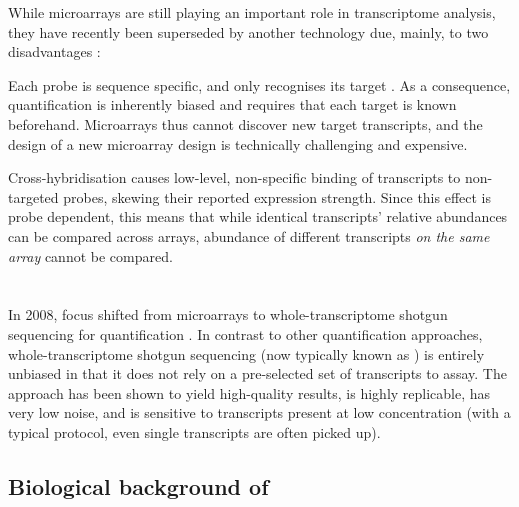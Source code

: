 While microarrays are still playing an important role in transcriptome analysis,
they have recently been superseded by another technology due, mainly, to two
disadvantages \citep{Casneuf:2007,Marioni:2008}:
\begin{enumerate*}
    \item Each probe is sequence specific, and only recognises its target \mrna.
        As a consequence, quantification is inherently biased and requires that
        each target is known beforehand. Microarrays thus cannot discover new
        target transcripts, and the design of a new microarray design is
        technically challenging and expensive.
    \item Cross-hybridisation causes low-level, non-specific binding of
        transcripts to non-targeted probes, skewing their reported expression
        strength. Since this effect is probe dependent, this means that
        while identical transcripts’ relative abundances can be compared across
        arrays, abundance of different transcripts \emph{on the same array}
        cannot be compared.
\end{enumerate*}

\section{}

In 2008, focus shifted from microarrays to whole-transcriptome shotgun
sequencing for \rna quantification \citep{Mortazavi:2008,Marioni:2008}. In
contrast to other \rna quantification approaches, whole-transcriptome shotgun
sequencing (now typically known as \rnaseq) is entirely unbiased in that it does
not rely on a pre-selected set of transcripts to assay. The approach has been
shown to yield high-quality results, is highly replicable, has very low noise,
and is sensitive to transcripts present at low concentration (with a typical
protocol, even single transcripts are often picked up).

\subsection{Biological background of }

